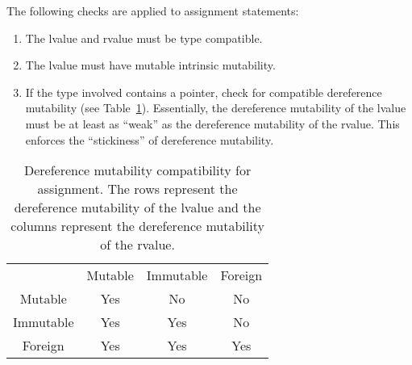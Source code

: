 
The following checks are applied to assignment statements:
\begin{enumerate}
\item The lvalue and rvalue must be type compatible.
\item The lvalue must have mutable intrinsic mutability.
\item If the type involved contains a pointer, check for compatible dereference mutability (see Table~\ref{assignmut}).
  Essentially, the dereference mutability of the lvalue must be at least as ``weak'' as the dereference mutability of the rvalue.
  This enforces the ``stickiness'' of dereference mutability.
\end{enumerate}


\begin{table}[H]
  \centering
  \begin{tabular}{cccc}
              & Mutable & Immutable & Foreign \\
    Mutable   & Yes     & No        & No      \\
    Immutable & Yes     & Yes       & No      \\
    Foreign   & Yes     & Yes       & Yes     \\
    \end{tabular}
  \caption{Dereference mutability compatibility for assignment.  The rows represent the dereference mutability of the lvalue and the columns represent the dereference mutability of the rvalue.\label{assignmut}}
\end{table}

